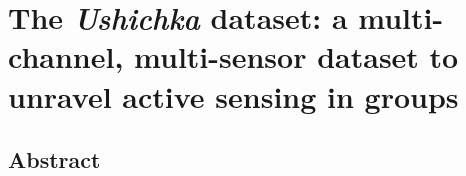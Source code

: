 \documentclass[
]{book}
\begin{document}
\hypertarget{ushichkachapter}{%
\chapter{\texorpdfstring{The \emph{Ushichka} dataset: a multi-channel, multi-sensor dataset to unravel active sensing in groups}{The Ushichka dataset: a multi-channel, multi-sensor dataset to unravel active sensing in groups}}\label{ushichkachapter}}


\newpage

\hypertarget{ushichka_abstract}{%
\section*{Abstract}\label{ushichka_abstract}}
\end{document}
